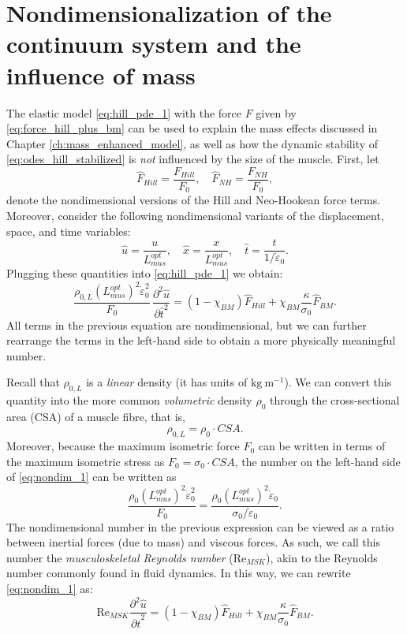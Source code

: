 \documentclass{sfuthesis}
\numberwithin{equation}{section}
\numberwithin{figure}{chapter}
\numberwithin{table}{chapter}
\theoremstyle{definition}
\newcommand{\pder}[2]{\dfrac{\partial #1}{\partial #2}}
\newcommand{\depsilon}{\dot{\varepsilon}}
\begin{document}
\section{Nondimensionalization of the continuum system and the influence of mass}

The elastic model \eqref{eq:hill_pde_1} with the force $F$ given by \eqref{eq:force_hill_plus_bm} can be used to explain the mass effects discussed in Chapter \ref{ch:mass_enhanced_model}, as well as how the dynamic stability of \eqref{eq:odes_hill_stabilized} is \textit{not} influenced by the size of the muscle. First, let
\begin{equation}
    \widehat{F}_{Hill} = \dfrac{F_{Hill}}{F_0}, \quad \widehat{F}_{NH} = \dfrac{F_{NH}}{F_0},
\end{equation}
denote the nondimensional versions of the Hill and Neo-Hookean force terms. Moreover, consider the following nondimensional variants of the  displacement, space, and time variables:
\begin{equation}
    \widehat{u} = \dfrac{u}{L_{mus}^{opt}}, \quad \widehat{x} = \dfrac{x}{L_{mus}^{opt}}, \quad \widehat{t} = \dfrac{t}{1/\depsilon_0}.
\end{equation}
Plugging these quantities into \eqref{eq:hill_pde_1} we obtain:
\begin{equation} \label{eq:nondim_1}
    \dfrac{\rho_{0,L} (L_{mus}^{opt})^2 \depsilon_0^2}{F_0} \, \pder{^2 \widehat{u}}{\widehat{t}^2} = (1-\chi_{BM}) \widehat{F}_{Hill} + \chi_{BM} \dfrac{\kappa}{\sigma_0} \widehat{F}_{BM}.
\end{equation}
All terms in the previous equation are nondimensional, but we can further rearrange the terms in the left-hand side to obtain a more physically meaningful number. 

Recall that $\rho_{0,L}$ is a \textit{linear} density (it has units of $\text{kg} \ \text{m}^{-1}$). We can convert this quantity into the more common \textit{volumetric} density $\rho_0$ through the cross-sectional area (CSA) of a muscle fibre, that is,
\begin{equation}
    \rho_{0,L} = \rho_0 \cdot CSA.
\end{equation}
Moreover, because the maximum isometric force $F_0$ can be written in terms of the maximum isometric stress as $F_0 = \sigma_0 \cdot CSA$, the number on the left-hand side of \eqref{eq:nondim_1} can be written as
\begin{equation}
    \dfrac{\rho_0 (L_{mus}^{opt})^2 \depsilon_0^2}{F_0} = \dfrac{\rho_0 (L_{mus}^{opt})^2 \depsilon_0}{\sigma_0 / \depsilon_0}.
\end{equation}
The nondimensional number in the previous expression can be viewed as a ratio between inertial forces (due to mass) and viscous forces. As such, we call this number the \textit{musculoskeletal Reynolds number} ($\text{Re}_{MSK}$), akin to the Reynolds number commonly found in fluid dynamics. In this way, we can rewrite \eqref{eq:nondim_1} as:
\begin{equation}
    \text{Re}_{MSK} \pder{^2 \widehat{u}}{\widehat{t}^2} = (1-\chi_{BM}) \widehat{F}_{Hill} + \chi_{BM} \dfrac{\kappa}{\sigma_0} \widehat{F}_{BM}.
\end{equation}
\end{document}
